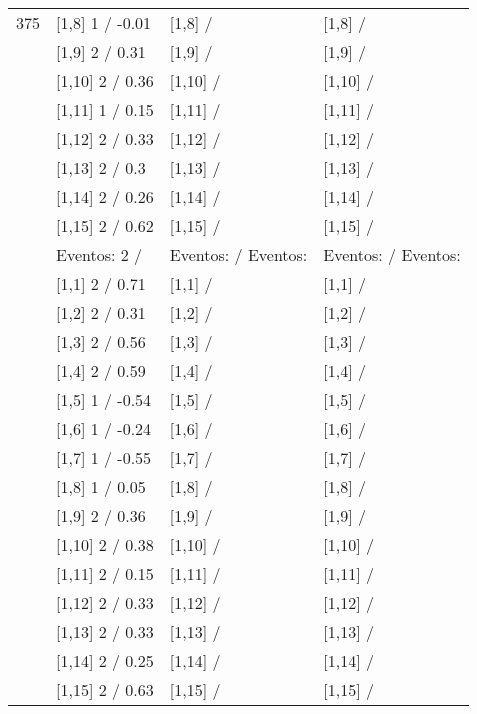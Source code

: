 \begin{table}
\begin{tabular}[t]{llll}
375 & {}[1,8] 1  / -0.01 & {}[1,8]  / & {}[1,8]  /\\
\addlinespace
 & {}[1,9] 2  / 0.31 & {}[1,9]  / & {}[1,9]  /\\
 & {}[1,10] 2  / 0.36 & {}[1,10]  / & {}[1,10]  /\\
 & {}[1,11] 1  / 0.15 & {}[1,11]  / & {}[1,11]  /\\
 & {}[1,12] 2  / 0.33 & {}[1,12]  / & {}[1,12]  /\\
 & {}[1,13] 2  / 0.3 & {}[1,13]  / & {}[1,13]  /\\
\addlinespace
 & {}[1,14] 2  / 0.26 & {}[1,14]  / & {}[1,14]  /\\
 & {}[1,15] 2  / 0.62 & {}[1,15]  / & {}[1,15]  /\\
 & Eventos:  2 / & Eventos:   / Eventos: & Eventos:   / Eventos:\\
 & {}[1,1] 2  / 0.71 & {}[1,1]  / & {}[1,1]  /\\
 & {}[1,2] 2  / 0.31 & {}[1,2]  / & {}[1,2]  /\\
\addlinespace
 & {}[1,3] 2  / 0.56 & {}[1,3]  / & {}[1,3]  /\\
 & {}[1,4] 2  / 0.59 & {}[1,4]  / & {}[1,4]  /\\
 & {}[1,5] 1  / -0.54 & {}[1,5]  / & {}[1,5]  /\\
 & {}[1,6] 1  / -0.24 & {}[1,6]  / & {}[1,6]  /\\
 & {}[1,7] 1  / -0.55 & {}[1,7]  / & {}[1,7]  /\\
\addlinespace
500 & {}[1,8] 1  / 0.05 & {}[1,8]  / & {}[1,8]  /\\
 & {}[1,9] 2  / 0.36 & {}[1,9]  / & {}[1,9]  /\\
 & {}[1,10] 2  / 0.38 & {}[1,10]  / & {}[1,10]  /\\
 & {}[1,11] 2  / 0.15 & {}[1,11]  / & {}[1,11]  /\\
 & {}[1,12] 2  / 0.33 & {}[1,12]  / & {}[1,12]  /\\
\addlinespace
 & {}[1,13] 2  / 0.33 & {}[1,13]  / & {}[1,13]  /\\
 & {}[1,14] 2  / 0.25 & {}[1,14]  / & {}[1,14]  /\\
 & {}[1,15] 2  / 0.63 & {}[1,15]  / & {}[1,15]  /\\
\bottomrule
\end{tabular}
\end{table}
